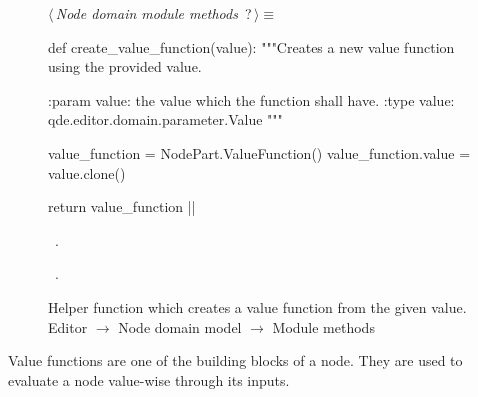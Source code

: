 \documentclass[%
    a4paper,    %
    justified,  %
    nobib,      %
    openany     %
]{tufte-book}
\begin{document}
\begin{figure}
\begin{flushleft} \small
\begin{minipage}{\linewidth}\label{scrap112}\raggedright\small
{} $\langle\,${\itshape Node domain module methods}\nobreak\ {\footnotesize {?}}$\,\rangle\equiv$
\vspace{-1ex}
\begin{pythoncode}
def create_value_function(value):
    """Creates a new value function using the provided value.

    :param value: the value which the function shall have.
    :type  value: qde.editor.domain.parameter.Value
    """

    value_function = NodePart.ValueFunction()
    value_function.value = value.clone()

    return value_function
|\NWsep|
\end{pythoncode}
\vspace{1.5ex}
\footnotesize
\begin{list}{}{\setlength{\itemsep}{-\parsep}\setlength{\itemindent}{-\leftmargin}}
\item \NWtxtMacroDefBy\ .
\item \NWtxtMacroRefIn\ .

\item{}
\end{list}
\end{minipage}\vspace{4ex}
\end{flushleft}
\caption{Helper function which creates a value function from the given value.
  \newline{}\newline{}Editor $\rightarrow$ Node domain model $\rightarrow$
  Module methods}
\label{editor:lst:node-domain-model:module-methods:create-value-function}
\end{figure}

 Value functions are
one of the building blocks of a node. They are used to evaluate a node
value-wise through its inputs.
\end{document}
